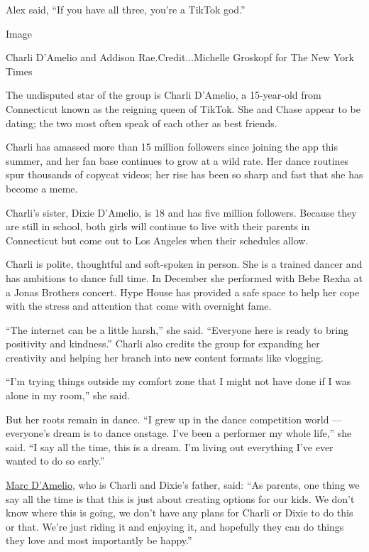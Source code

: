 Alex said, ``If you have all three, you're a TikTok god.''

Image

Charli D'Amelio and Addison Rae.Credit...Michelle Groskopf for The New
York Times

The undisputed star of the group is Charli D'Amelio, a 15-year-old from
Connecticut known as the reigning queen of TikTok. She and Chase appear
to be dating; the two most often speak of each other as best friends.

Charli has amassed more than 15 million followers since joining the app
this summer, and her fan base continues to grow at a wild rate. Her
dance routines spur thousands of copycat videos; her rise has been so
sharp and fast that she has become a meme.

Charli's sister, Dixie D'Amelio, is 18 and has five million followers.
Because they are still in school, both girls will continue to live with
their parents in Connecticut but come out to Los Angeles when their
schedules allow.

Charli is polite, thoughtful and soft-spoken in person. She is a trained
dancer and has ambitions to dance full time. In December she performed
with Bebe Rexha at a Jonas Brothers concert. Hype House has provided a
safe space to help her cope with the stress and attention that come with
overnight fame.

``The internet can be a little harsh,'' she said. ``Everyone here is
ready to bring positivity and kindness.'' Charli also credits the group
for expanding her creativity and helping her branch into new content
formats like vlogging.

``I'm trying things outside my comfort zone that I might not have done
if I was alone in my room,'' she said.

But her roots remain in dance. ``I grew up in the dance competition
world --- everyone's dream is to dance onstage. I've been a performer my
whole life,'' she said. ``I say all the time, this is a dream. I'm
living out everything I've ever wanted to do so early.''

\href{https://www.instagram.com/marc.damelio/?hl=en}{Marc D'Amelio}, who
is Charli and Dixie's father, said: ``As parents, one thing we say all
the time is that this is just about creating options for our kids. We
don't know where this is going, we don't have any plans for Charli or
Dixie to do this or that. We're just riding it and enjoying it, and
hopefully they can do things they love and most importantly be happy.''

